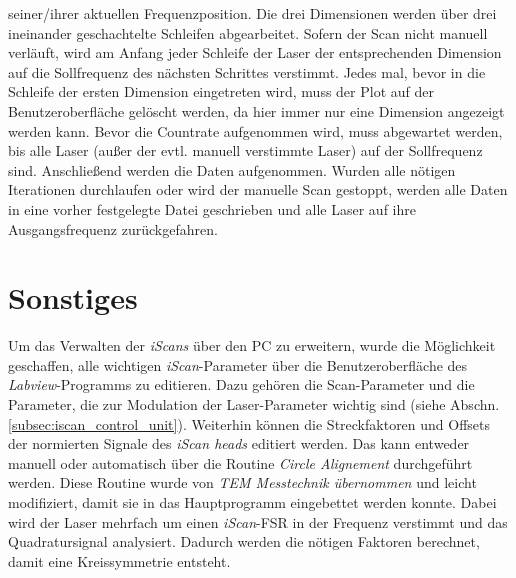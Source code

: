 seiner/ihrer aktuellen Frequenzposition. Die drei Dimensionen werden über
drei ineinander geschachtelte Schleifen abgearbeitet. Sofern der Scan nicht
manuell verläuft, wird am Anfang jeder Schleife der Laser der entsprechenden
Dimension auf die Sollfrequenz des nächsten Schrittes verstimmt. Jedes mal, bevor in die Schleife
der ersten Dimension eingetreten wird, muss der Plot auf der Benutzeroberfläche
gelöscht werden, da hier immer nur eine Dimension angezeigt werden kann. Bevor
die Countrate aufgenommen wird, muss abgewartet werden, bis alle Laser (außer
der evtl. manuell verstimmte Laser) auf der Sollfrequenz sind.
Anschließend werden die Daten aufgenommen. Wurden alle nötigen Iterationen
durchlaufen oder wird der manuelle Scan gestoppt, werden alle Daten in eine
vorher festgelegte Datei geschrieben und alle Laser auf ihre Ausgangsfrequenz
zurückgefahren.

\section{Sonstiges}\label{sec:sonstiges}
Um das Verwalten der \textit{iScans} über den PC zu erweitern, wurde die
Möglichkeit geschaffen, alle wichtigen \textit{iScan}-Parameter über die
Benutzeroberfläche des \textit{Labview}-Programms zu editieren. Dazu gehören
die Scan-Parameter und die Parameter, die zur Modulation der
Laser-Parameter wichtig sind (siehe Abschn. \ref{subsec:iscan_control_unit}).
Weiterhin können die Streckfaktoren und Offsets der normierten Signale des
\textit{iScan heads} editiert werden. Das kann entweder manuell
oder automatisch über die Routine \textit{Circle Alignement} durchgeführt
werden. Diese Routine wurde von \textit{TEM Messtechnik übernommen} und leicht
modifiziert, damit sie in das Hauptprogramm eingebettet werden konnte. Dabei
wird der Laser mehrfach um einen \textit{iScan}-FSR in der Frequenz verstimmt
und das Quadratursignal analysiert. Dadurch werden die nötigen Faktoren
berechnet, damit eine Kreissymmetrie entsteht.